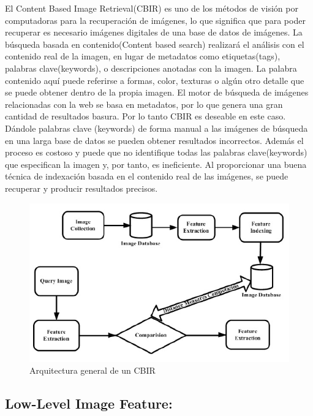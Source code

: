 \documentclass{llncs}
\begin{document}
El Content Based Image Retrieval(CBIR) es uno de los m\'etodos de visi\'on por computadoras para la recuperaci\'on de
im\'agenes, lo que significa que para poder recuperar es necesario im\'agenes digitales de una base de datos de im\'agenes. 
La b\'usqueda basada en contenido(Content based search) realizar\'a el an\'alisis con el contenido real de la imagen, en 
lugar de metadatos como etiquetas(tags), palabras clave(keywords), o descripciones anotadas con la imagen. La palabra 
contenido aqu\'i puede referirse a formas, color, texturas o alg\'un otro detalle que se puede obtener dentro de la propia
imagen. El motor de búsqueda de imágenes relacionadas con la web se basa en metadatos, por lo que genera una gran cantidad 
de resultados basura. Por lo tanto CBIR es deseable en este caso. D\'andole palabras clave (keywords) de forma manual a las 
im\'agenes de b\'usqueda en una larga base de datos se pueden obtener resultados incorrectos. Adem\'as el proceso es costoso y 
puede que no identifique todas las palabras clave(keywords) que especifican la imagen y, por tanto, es ineficiente. Al 
proporcionar una buena técnica de indexación basada en el contenido real de las imágenes, se puede recuperar y producir
resultados precisos.
\\
\begin{figure}
    \caption{Arquitectura general de un CBIR}
    \includegraphics[scale = .4]{./images/cbir arquitecture.png}
\end{figure}




\subsection{Low-Level Image Feature:}
\end{document}
